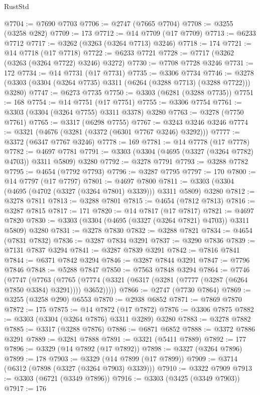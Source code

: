\begin{lexlean}{RustStd}
\begin{coremodule}
@7704 := @7690 @7703
@7706 := @2747 (@7665 @7704)
@7708 := @3255 (@3258 @282)
@7709 := 173
@7712 := @14 @7709 (@17 @7709)
@7713 := @6233 @7712
@7717 := @3262 (@3263 (@3264 @7713) @3246)
@7718 := 174
@7721 := @14 @7718 (@17 @7718)
@7722 := @6233 @7721
@7728 := @7717 (@3262 (@3263 (@3264 @7722) @3246) @3272)
@7730 := @7708 @7728 @3246
@7731 := 172
@7734 := @14 @7731 (@17 @7731)
@7735 := @3306 @7734
@7746 := @3278 (@3303 (@3304 (@3264 @7735) @3311 (@6264 (@3288 @7713) (@3288 @7722))) @3280)
@7747 := @6273 @7735
@7750 := @3303 (@6281 (@3288 @7735))
@7751 := 168
@7754 := @14 @7751 (@17 @7751)
@7755 := @3306 @7754
@7761 := @3303 (@3304 (@3264 @7755) @3311 @3378) @3280
@7763 := @3278 (@7750 @7761)
@7765 := @3317 (@6298 @7755)
@7767 := @3243 @3246 @3246
@7774 := @3321 (@4676 (@3281 (@3372 (@6301 @7767 @3246) @3292)))
@7777 := @3372 (@6347 @7767 @3246)
@7778 := 169
@7781 := @14 @7778 (@17 @7778)
@7782 := @4697 @7781
@7791 := @3303 (@3304 (@4695 (@3327 (@3264 @7782) @4703)) @3311 @5809) @3280
@7792 := @3278 @7791
@7793 := @3288 @7782
@7795 := @4654 (@7792 @7793)
@7796 := @3287 @7795
@7797 := 170
@7800 := @14 @7797 (@17 @7797)
@7801 := @4697 @7800
@7811 := @3303 (@3304 (@4695 (@4702 (@3327 (@3264 @7801) @3339))) @3311 @5809) @3280
@7812 := @3278 @7811
@7813 := @3288 @7801
@7815 := @4654 (@7812 @7813)
@7816 := @3287 @7815
@7817 := 171
@7820 := @14 @7817 (@17 @7817)
@7821 := @4697 @7820
@7830 := @3303 (@3304 (@4695 (@3327 (@3264 @7821) @4703)) @3311 @5809) @3280
@7831 := @3278 @7830
@7832 := @3288 @7821
@7834 := @4654 (@7831 @7832)
@7836 := @3287 @7834 @3291
@7837 := @3290 @7836
@7839 := @7131 @7837 @3294
@7841 := @3287 @7839 @3291
@7842 := @7816 @7841
@7844 := @6371 @7842 @3294
@7846 := @3287 @7844 @3291
@7847 := @7796 @7846
@7848 := @5288 @7847
@7850 := @7563 @7848 @3294
@7864 := @7746
    (@7747
      (@7763
        (@7765 (@7774 (@3321 (@6317 (@3281 (@7777 (@3287 (@6264 @7850 @3384) @3291)))) @3652)))))
@7866 := @2747 (@7730 @7864)
@7869 := @3255 (@3258 @290) @6553
@7870 := @2938 @6852
@7871 := @7869 @7870
@7872 := 175
@7875 := @14 @7872 (@17 @7872)
@7876 := @3306 @7875
@7882 := @3303 (@3304 (@3264 @7876) @3311 @3289) @3280
@7883 := @3278 @7882
@7885 := @3317 (@3288 @7876)
@7886 := @6871 @6852
@7888 := @3372 @7886 @3291
@7889 := @3281 @7888
@7891 := @3321 (@5411 @7889)
@7892 := 177
@7896 := @3329 (@14 @7892 (@17 @7892))
@7898 := @3327 (@3264 @7896)
@7899 := 178
@7903 := @3329 (@14 @7899 (@17 @7899))
@7909 := @3714 (@6312 (@7898 (@3327 (@3264 @7903) @3339)))
@7910 := @3322 @7909
@7913 := @3303 (@6721 (@3349 @7896))
@7916 := @3303 (@3425 (@3349 @7903))
@7917 := 176

\end{coremodule}
\end{lexlean}
